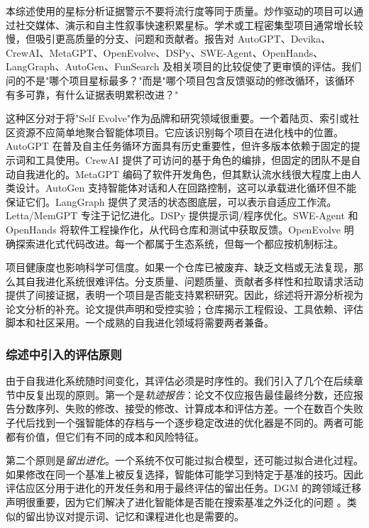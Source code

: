 本综述使用的星标分析证据警示不要将流行度等同于质量。炒作驱动的项目可以通过社交媒体、演示和自主性叙事快速积累星标。学术或工程密集型项目通常增长较慢，但吸引更高质量的分支、问题和贡献者。报告对 AutoGPT、Devika、CrewAI、MetaGPT、OpenEvolve、DSPy、SWE-Agent、OpenHands、LangGraph、AutoGen、FunSearch 及相关项目的比较促使了更审慎的评估。我们问的不是"哪个项目星标最多？"而是"哪个项目包含反馈驱动的修改循环，该循环有多可靠，有什么证据表明累积改进？"

这种区分对于将"Self Evolve"作为品牌和研究领域很重要。一个着陆页、索引或社区资源不应简单地聚合智能体项目。它应该识别每个项目在进化栈中的位置。AutoGPT 在普及自主任务循环方面具有历史重要性，但许多版本依赖于固定的提示词和工具使用。CrewAI 提供了可访问的基于角色的编排，但固定的团队不是自动自我进化的。MetaGPT 编码了软件开发角色，但其默认流水线很大程度上由人类设计。AutoGen 支持智能体对话和人在回路控制，这可以承载进化循环但不能保证它们。LangGraph 提供了灵活的状态图底层，可以表示自适应工作流。Letta/MemGPT 专注于记忆进化。DSPy 提供提示词/程序优化。SWE-Agent 和 OpenHands 将软件工程操作化，从代码仓库和测试中获取反馈。OpenEvolve 明确探索进化式代码改进。每一个都属于生态系统，但每一个都应按机制标注。

项目健康度也影响科学可信度。如果一个仓库已被废弃、缺乏文档或无法复现，那么其自我进化系统很难评估。分支质量、问题质量、贡献者多样性和拉取请求活动提供了间接证据，表明一个项目是否能支持累积研究。因此，综述将开源分析视为论文分析的补充。论文提供声明和受控实验；仓库揭示工程假设、工具依赖、评估脚本和社区采用。一个成熟的自我进化领域将需要两者兼备。

\subsubsection{综述中引入的评估原则}

由于自我进化系统随时间变化，其评估必须是时序性的。我们引入了几个在后续章节中反复出现的原则。第一个是\emph{轨迹报告}：论文不仅应报告最佳最终分数，还应报告分数序列、失败的修改、接受的修改、计算成本和评估方差。一个在数百个失败子代后找到一个强智能体的存档与一个逐步稳定改进的优化器是不同的。两者可能都有价值，但它们有不同的成本和风险特征。

第二个原则是\emph{留出进化}。一个系统不仅可能过拟合模型，还可能过拟合进化过程。如果修改在同一个基准上被反复选择，智能体可能学习到特定于基准的技巧。因此评估应区分用于进化的开发任务和用于最终评估的留出任务。DGM 的跨领域迁移声明很重要，因为它们解决了进化智能体是否能在搜索基准之外泛化的问题 \cite{darwingodelmachine2025}。类似的留出协议对提示词、记忆和课程进化也是需要的。

